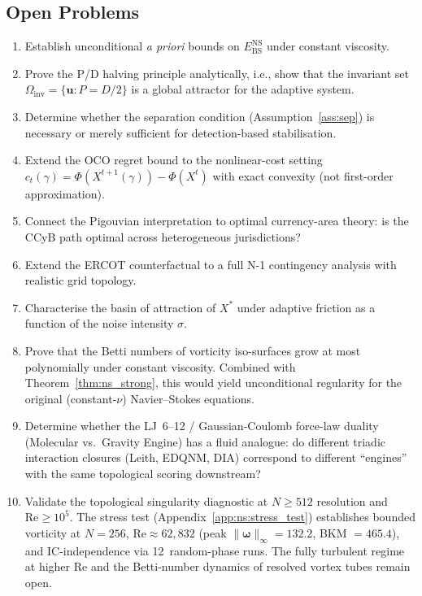\documentclass[final]{siamltex}
\newcommand{\Ebs}{E_{\mathrm{BS}}}
\newcommand{\Xst}{X^*}
\begin{document}
\subsection{Open Problems}

\begin{enumerate}
\item Establish unconditional \emph{a priori} bounds on
  $\Ebs^{\mathrm{NS}}$ under constant viscosity.

\item Prove the P/D halving principle analytically, i.e.,
  show that the invariant set $\Omega_{\mathrm{inv}} =
  \{\bm{u} : P = D/2\}$ is a global attractor for
  the adaptive system.

\item Determine whether the separation condition
  (Assumption~\ref{ass:sep}) is necessary or merely sufficient for
  detection-based stabilisation.

\item Extend the OCO regret bound to the nonlinear-cost setting
  $c_t(\gamma)=\Phi(X^{t+1}(\gamma))-\Phi(X^t)$ with exact
  convexity (not first-order approximation).

\item Connect the Pigouvian interpretation to optimal currency-area
  theory: is the CCyB path optimal across heterogeneous
  jurisdictions?

\item Extend the ERCOT counterfactual to a full N-1 contingency
  analysis with realistic grid topology.

\item Characterise the basin of attraction of $\Xst$ under
  adaptive friction as a function of the noise intensity $\sigma$.

\item Prove that the Betti numbers of vorticity iso-surfaces grow
  at most polynomially under constant viscosity.  Combined with
  Theorem~\ref{thm:ns_strong}, this would yield unconditional
  regularity for the original (constant-$\nu$) Navier--Stokes
  equations.

\item Determine whether the LJ~6--12 / Gaussian-Coulomb force-law
  duality (Molecular vs.\ Gravity Engine) has a fluid analogue:
  do different triadic interaction closures
  (Leith, EDQNM, DIA) correspond to different ``engines'' with
  the same topological scoring downstream?

\item Validate the topological singularity diagnostic at
  $N \ge 512$ resolution and $\mathrm{Re} \ge 10^5$.  The
  stress test (Appendix~\ref{app:ns:stress_test}) establishes
  bounded vorticity at $N=256$, $\mathrm{Re}\approx 62{,}832$
  (peak $\|\bm{\omega}\|_\infty = 132.2$, BKM $= 465.4$),
  and IC-independence via 12~random-phase runs.
  The fully turbulent regime at higher Re and the
  Betti-number dynamics of resolved vortex tubes remain open.
\end{enumerate}
\end{document}
